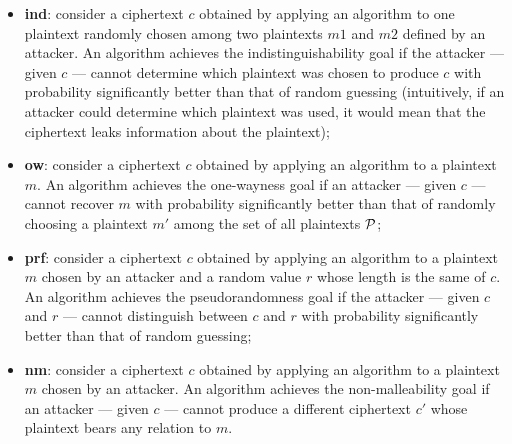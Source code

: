 \begin{itemize}
	\item \textbf{\gls{ind}}: consider a ciphertext $c$ obtained by applying an algorithm to one plaintext randomly chosen among two plaintexts $m1$ and $m2$ defined by an attacker. An algorithm achieves the indistinguishability goal if the attacker --- given $c$ --- cannot determine which plaintext was chosen to produce $c$ with probability significantly better than that of random guessing (intuitively, if an attacker could determine which plaintext was used, it would mean that the ciphertext leaks information about the plaintext);
	\item \textbf{\gls{ow}}: consider a ciphertext $c$ obtained by applying an algorithm to a plaintext $m$. An algorithm achieves the one-wayness goal if an attacker --- given $c$ --- cannot recover $m$ with probability significantly better than that of randomly choosing a plaintext $m'$ among the set of all plaintexts $\mathcal{P}$;
	\item \textbf{\gls{prf}}: consider a ciphertext $c$ obtained by applying an algorithm to a plaintext $m$ chosen by an attacker and a random value $r$ whose length is the same of $c$. An algorithm achieves the pseudorandomness goal if the attacker --- given $c$ and $r$ --- cannot distinguish between $c$ and $r$ with probability significantly better than that of random guessing;
	\item \textbf{\gls{nm}}: consider a ciphertext $c$ obtained by applying an algorithm to a plaintext $m$ chosen by an attacker. An algorithm achieves the non-malleability goal if an attacker --- given $c$ --- cannot produce a different ciphertext $c'$ whose plaintext bears any relation to $m$.
\end{itemize}

